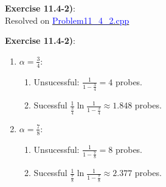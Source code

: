 \documentclass{article}
\newcounter{exercise}[section]   %
\begin{document}
\textbf{Exercise 11.4-2)}:\\
Resolved on \href{https://github.com/Graburr/Algorithms_CLRS_4ed_solutions/tree/main/chapter3/Hash_Tables/Problem11_4_2.cpp}
{\textcolor{Blue}{Problem11\_4\_2.cpp}}

\textbf{Exercise 11.4-2)}:
\begin{enumerate}
    \item \(\alpha = \frac{3}{4}\):
    \begin{enumerate}
        \item Unsucessful: \(\frac{1}{1 - \frac{3}{4}} = 4\) probes.
        \item Sucessful \(\frac{1}{\frac{3}{4}} \ln \frac{1}{1 - \frac{3}{4}} \approx 1.848\)
        probes.
    \end{enumerate}

    \item \(\alpha = \frac{7}{8}\):
    \begin{enumerate}
        \item Unsucessful: \(\frac{1}{1 - \frac{7}{8}} = 8\) probes.
        \item Sucessful \(\frac{1}{\frac{7}{8}} \ln \frac{1}{1 - \frac{7}{8}} \approx 2.377\)
        probes.
    \end{enumerate}
    
\end{enumerate}
\end{document}
